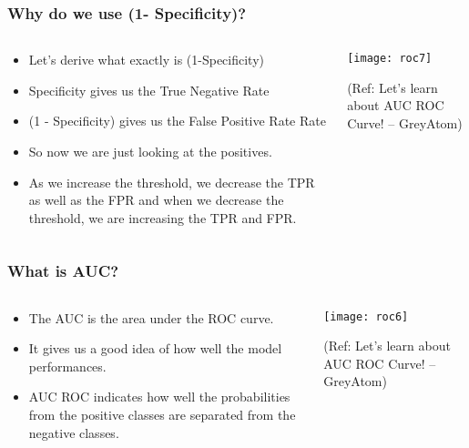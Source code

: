 \begin{frame}[fragile]\frametitle{Why do we use (1- Specificity)?}

\begin{columns}
\begin{column}[T]{0.5\linewidth}
\begin{itemize}
\item Let’s derive what exactly is (1-Specificity)
\item  Specificity gives us the True Negative Rate
\item  (1 - Specificity) gives us the  False Positive Rate Rate
\item So now we are just looking at the positives. 
\item As we increase the threshold,
we decrease the TPR as well as the FPR and when we decrease the
threshold, we are increasing the TPR and FPR.
\end{itemize}
\end{column}
\begin{column}[T]{0.5\linewidth}

\begin{center}
\texttt{[image: roc7]}
\end{center}

\tiny{(Ref: Let's learn about AUC ROC Curve! – GreyAtom)}
\end{column}

\end{columns}
\end{frame}


\begin{frame}[fragile]\frametitle{What is AUC?}

\begin{columns}
\begin{column}[T]{0.5\linewidth}
\begin{itemize}
\item The AUC is the area under the ROC curve. 
\item It gives us a good idea
of how well the model performances.
\item AUC ROC indicates how well the probabilities from the positive
classes are separated from the negative classes.
\end{itemize}
\end{column}
\begin{column}[T]{0.5\linewidth}

\begin{center}
\texttt{[image: roc6]}
\end{center}

\tiny{(Ref: Let's learn about AUC ROC Curve! – GreyAtom)}
\end{column}

\end{columns}
\end{frame}



